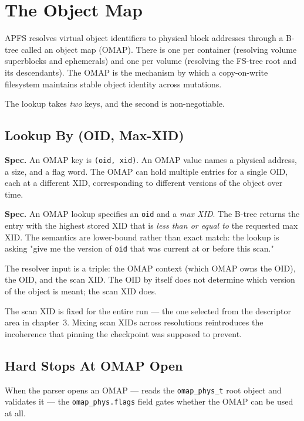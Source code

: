 \chapter{The Object Map}

APFS resolves virtual object identifiers to physical block
addresses through a B-tree called an object map (OMAP). There is
one per container (resolving volume superblocks and ephemerals)
and one per volume (resolving the FS-tree root and its
descendants). The OMAP is the mechanism by which a copy-on-write
filesystem maintains stable object identity across mutations.

The lookup takes \emph{two} keys, and the second is non-negotiable.

\section{Lookup By (OID, Max-XID)}

\textbf{Spec.} An OMAP key is \texttt{(oid, xid)}. An OMAP value names
a physical address, a size, and a flag word. The OMAP can hold
multiple entries for a single OID, each at a different XID,
corresponding to different versions of the object over time.

\textbf{Spec.} An OMAP lookup specifies an \texttt{oid} and a
\emph{max XID}. The B-tree returns the entry with the highest stored
XID that is \emph{less than or equal to} the requested max XID. The
semantics are lower-bound rather than exact match: the lookup is
asking "give me the version of \texttt{oid} that was current at or
before this scan."

The resolver input is a triple: the OMAP context (which OMAP owns
the OID), the OID, and the scan XID. The OID by itself does not
determine which version of the object is meant; the scan XID does.

The scan XID is fixed for the entire run --- the one selected from
the descriptor area in chapter~3. Mixing scan XIDs across
resolutions reintroduces the incoherence that pinning the
checkpoint was supposed to prevent.

\section{Hard Stops At OMAP Open}

When the parser opens an OMAP --- reads the
\texttt{omap\_phys\_t} root object and validates it --- the
\texttt{omap\_phys.flags} field gates whether the OMAP can be used at
all.

